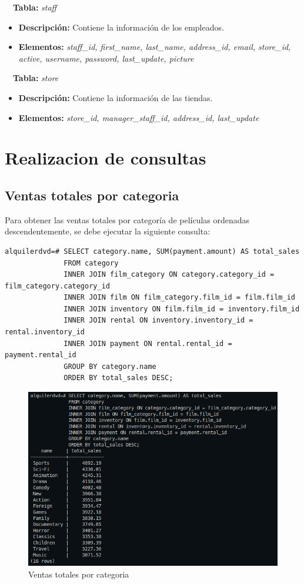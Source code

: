 \documentclass{report}
\begin{document}
\CIRCLE \ \ \textbf{Tabla:} \emph{staff}
\begin{itemize}
  \item \textbf{Descripción:} Contiene la información de los empleados.
  \item \textbf{Elementos:} \emph{staff\_id, first\_name, last\_name, address\_id, email, store\_id, active, username, password, last\_update, picture}
\end{itemize}

\CIRCLE \ \ \textbf{Tabla:} \emph{store}
\begin{itemize}
  \item \textbf{Descripción:} Contiene la información de las tiendas.
  \item \textbf{Elementos:} \emph{store\_id, manager\_staff\_id, address\_id, last\_update}
\end{itemize}

\chapter{Realizacion de consultas}

\section{Ventas totales por categoria}
Para obtener las ventas totales por categoría de películas ordenadas descendentemente, se debe ejecutar la siguiente consulta:
\begin{verbatim}
alquilerdvd=# SELECT category.name, SUM(payment.amount) AS total_sales
              FROM category
              INNER JOIN film_category ON category.category_id = film_category.category_id
              INNER JOIN film ON film_category.film_id = film.film_id
              INNER JOIN inventory ON film.film_id = inventory.film_id
              INNER JOIN rental ON inventory.inventory_id = rental.inventory_id
              INNER JOIN payment ON rental.rental_id = payment.rental_id
              GROUP BY category.name
              ORDER BY total_sales DESC;
\end{verbatim}
\begin{figure}[H]
  \centering
  \includegraphics[scale=0.48]{img/querie_a.png}
  \caption{Ventas totales por categoria}
  \label{fig:ventas totales por categoria}
\end{figure}
\end{document}
